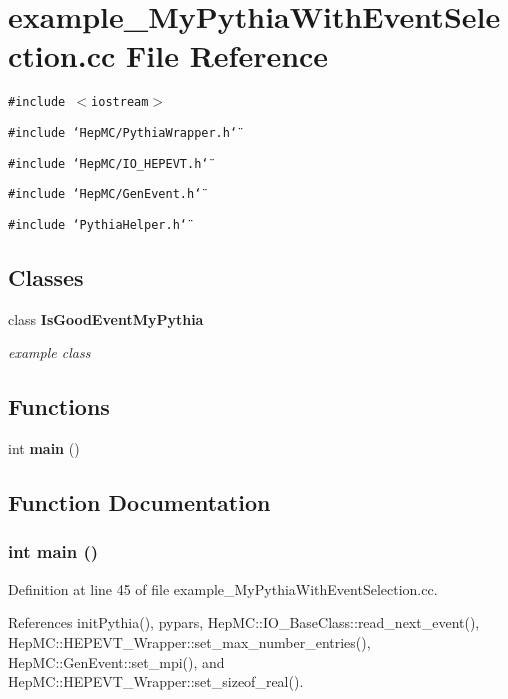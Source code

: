\section{example\_\-My\-Pythia\-With\-Event\-Selection.cc File Reference}
\label{example__MyPythiaWithEventSelection_8cc}
{\tt \#include $<$iostream$>$}\par
{\tt \#include \char`\"{}Hep\-MC/Pythia\-Wrapper.h\char`\"{}}\par
{\tt \#include \char`\"{}Hep\-MC/IO\_\-HEPEVT.h\char`\"{}}\par
{\tt \#include \char`\"{}Hep\-MC/Gen\-Event.h\char`\"{}}\par
{\tt \#include \char`\"{}Pythia\-Helper.h\char`\"{}}\par
\subsection*{Classes}
\begin{CompactItemize}
\item 
class {\bf Is\-Good\-Event\-My\-Pythia}
\begin{CompactList}\small\item\em example class \item\end{CompactList}\end{CompactItemize}
\subsection*{Functions}
\begin{CompactItemize}
\item 
int {\bf main} ()
\end{CompactItemize}


\subsection{Function Documentation}
\subsubsection{\setlength{\rightskip}{0pt plus 5cm}int main ()}\label{example__MyPythiaWithEventSelection_8cc_e66f6b31b5ad750f1fe042a706a4e3d4}




Definition at line 45 of file example\_\-My\-Pythia\-With\-Event\-Selection.cc.

References init\-Pythia(), pypars, Hep\-MC::IO\_\-Base\-Class::read\_\-next\_\-event(), Hep\-MC::HEPEVT\_\-Wrapper::set\_\-max\_\-number\_\-entries(), Hep\-MC::Gen\-Event::set\_\-mpi(), and Hep\-MC::HEPEVT\_\-Wrapper::set\_\-sizeof\_\-real().
